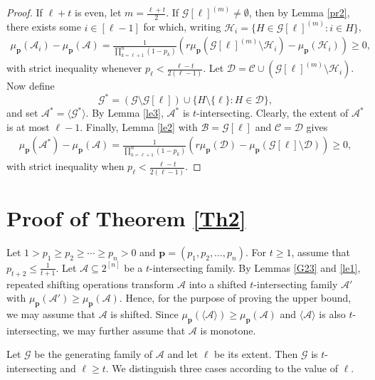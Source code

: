\documentclass[11pt]{article}
\begin{document}
\begin{proof}
If $\ell+t$ is even, let $m=\frac{\ell+t}{2}$. If $\mathcal{G}[\ell]^{(m)}\neq \emptyset$,  then by Lemma \ref{pr2}, there exists some $i\in[\ell-1]$ for which, writing  $\mathcal{H}_i=\{H\in\mathcal{G}[\ell]^{(m)}: i\in H\}$,
\begin{align*}
\mu_{\mathbf{p}}(\mathcal{A}_i)-\mu_{\mathbf{p}}(\mathcal{A})=\frac{1}{\prod_{k=\ell+1}^n(1-p_k)}
\left(
r\mu_{\mathbf{p}}\left(\mathcal{G}[\ell]^{(m)}\setminus \mathcal{H}_{i}\right)
-\mu_{\mathbf{p}}\left(\mathcal{H}_i\right)
\right)\geq 0,
\end{align*}
with strict inequality  whenever $p_{\ell}<\frac{\ell-t}{2(\ell-1)}$.
Let $\mathcal{D}=\mathcal{C}\cup (\mathcal{G}[\ell]^{(m)}\setminus\mathcal{H}_i)$.
Now define
$$
\mathcal{G}^*=(\mathcal{G}\setminus\mathcal{G}[\ell])\cup\{H\setminus\{\ell\}: H\in\mathcal{D}\},
$$
and set $\mathcal{A}^*=\langle\mathcal{G}^*\rangle$.
By Lemma \ref{le3}, $\mathcal{A}^*$ is $t$-intersecting. Clearly, the extent of $\mathcal{A}^*$ is at most $\ell-1$.
Finally, Lemma \ref{le2} with $\mathcal{B}=\mathcal{G}[\ell]$ and $\mathcal{C}=\mathcal{D}$ gives
\begin{align*}
\mu_{\mathbf{p}}(\mathcal{A}^*)-\mu_{\mathbf{p}}(\mathcal{A})
=
\frac{1}{\prod_{k=\ell+1}^n(1-p_k)}
\left(
r\mu_{\mathbf{p}}(\mathcal{D})
-
\mu_{\mathbf{p}}(\mathcal{G}[\ell]\setminus\mathcal{D})
\right)\geq 0,
\end{align*}
with strict inequality when $p_{\ell}<\frac{\ell-t}{2(\ell-1)}$. 
\end{proof}

\section{Proof of Theorem \ref{Th2}}\label{se3}
Let $1 > p_1 \ge p_2 \ge \cdots \ge p_n > 0$ and $\textbf{p}=(p_1,p_2,\ldots,p_n)$. 
For $t\geq 1$, assume that $p_{t+2} \leq \frac{1}{t+1}$. 
Let $\mathcal{A} \subseteq 2^{[n]}$ be a $t$-intersecting family. 
By Lemmas \ref{G23} and \ref{le1}, repeated shifting operations transform $\mathcal{A}$ into a  shifted  $t$-intersecting family $\mathcal{A}'$ with $\mu_{\mathbf{p}}(\mathcal{A}')\ge \mu_{\mathbf{p}}(\mathcal{A})$. 
Hence, for the purpose of proving the upper bound, we may assume that $\mathcal{A}$  is  shifted. 
Since $\mu_{\mathbf{p}}(\langle\mathcal{A} \rangle) \geq \mu_{\mathbf{p}}(\mathcal{A})$ and $\langle \mathcal{A} \rangle$ is also $t$-intersecting, we may further assume that $\mathcal{A}$ is monotone.

 Let $\mathcal{G}$ be the generating family of $\mathcal{A}$  and let $\ell$ be its extent. Then $\mathcal{G}$
is $t$-intersecting and $\ell\geq t$.
We distinguish three cases according to the value of $\ell$.
\end{document}
